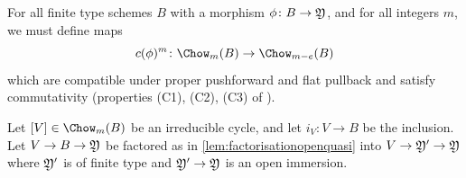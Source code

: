 For all finite type schemes $B$ with a morphism $\phi\colon B \to \frak Y$, and for all integers $m$, we must define maps
\[c(\phi)^{m}\colon \Chow_m(B) \to \Chow_{m-e}(B) \]
which are compatible under proper pushforward and flat pullback and satisfy commutativity (properties (C1), (C2), (C3) of \cite[Section 17.1]{Fulton1984Intersection-th}).



Let $[V] \in \Chow_m(B)$ be an irreducible cycle, and let $i_V\colon V \to B$ be the inclusion. Let $V \to B \to \frak Y$ be factored as in \cref{lem:factorisationopenquasi} into $V \to \frak Y' \to \frak Y$ where $\frak Y'$ is of finite type and $\frak Y' \to \frak Y$ is an open immersion.

